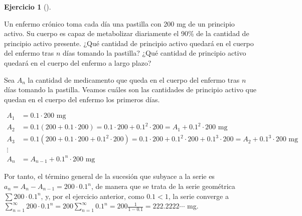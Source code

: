 \documentclass[
  a4paper,
]{scrreport}
\theoremstyle{definition}
\newtheorem{exercise}{Ejercicio}[chapter]
\theoremstyle{remark}
\begin{document}
\begin{exercise}[]\protect\hypertarget{exr-serie-geometrica-farmaco}{}\label{exr-serie-geometrica-farmaco}

Un enfermo crónico toma cada día una pastilla con 200 mg de un principio
activo. Su cuerpo es capaz de metabolizar diariamente el 90\% de la
cantidad de principio activo presente. ¿Qué cantidad de principio activo
quedará en el cuerpo del enfermo tras \(n\) días tomando la pastilla?
¿Qué cantidad de principio activo quedará en el cuerpo del enfermo a
largo plazo?

\end{exercise}

\begin{tcolorbox}[enhanced jigsaw, rightrule=.15mm, opacityback=0, bottomtitle=1mm, titlerule=0mm, toprule=.15mm, breakable, colframe=quarto-callout-tip-color-frame, left=2mm, opacitybacktitle=0.6, title=\textcolor{quarto-callout-tip-color}{\faLightbulb}\hspace{0.5em}{Solución}, toptitle=1mm, colback=white, colbacktitle=quarto-callout-tip-color!10!white, arc=.35mm, bottomrule=.15mm, coltitle=black, leftrule=.75mm]

Sea \(A_n\) la cantidad de medicamento que queda en el cuerpo del
enfermo tras \(n\) días tomando la pastilla. Veamos cuáles son las
cantidades de principio activo que quedan en el cuerpo del enfermo los
primeros días.

\begin{align*}
A_1 &= 0.1\cdot 200 \mbox{ mg}\\ 
A_2 &= 0.1 (200 + 0.1\cdot 200) = 0.1\cdot 200 + 0.1^2 \cdot 200 = A_1 + 0.1^2\cdot 200 \mbox{ mg}\\ 
A_3 &= 0.1 (200 + 0.1\cdot 200 + 0.1^2 \cdot 200) = 0.1\cdot 200 + 0.1^2 \cdot 200 + 0.1^3\cdot 200 = A_2 + 0.1^3\cdot 200 \mbox{ mg}\\ 
\vdots\\
A_n &= A_{n-1} + 0.1^n \cdot 200 \mbox{ mg}
\end{align*}

Por tanto, el término general de la sucesión que subyace a la serie es
\(a_n = A_n-A_{n-1} = 200\cdot 0.1^n\), de manera que se trata de la
serie geométrica \(\sum 200\cdot 0.1^n\), y, por el ejercicio anterior,
como \(0.1<1\), la serie converge a
\(\sum_{n=1}^\infty 200\cdot 0.1^n = 200\sum_{n=1}^\infty 0.1^n = 200\frac{1}{1-0.1} = 222.2222\cdots\)
mg.

\end{tcolorbox}
\end{document}
